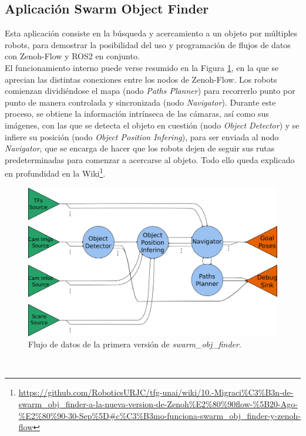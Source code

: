 \subsection{Aplicación Swarm Object Finder}
\label{sec:swarm_obj_finder}

Esta aplicación consiste en la búsqueda y acercamiento a un objeto por múltiples
robots, para demostrar la posibilidad del uso y programación de flujos de datos
con Zenoh-Flow y ROS2 en conjunto.
\\

El funcionamiento interno puede verse resumido en la Figura
\ref{fig:data_flow_scheme}, en la que se aprecian las distintas conexiones entre
los nodos de Zenoh-Flow.
Los robots comienzan dividiéndose el mapa (nodo \textit{Paths Planner}) para
recorrerlo punto por punto de manera controlada y sincronizada (nodo
\textit{Navigator}).
Durante este proceso, se obtiene la información intrínseca de las cámaras, así
como sus imágenes, con las que se detecta el objeto en cuestión (nodo
\textit{Object Detector}) y se infiere su posición (nodo \textit{Object Position
Infering}), para ser enviada al nodo \textit{Navigator}, que se encarga de hacer
que los robots dejen de seguir sus rutas predeterminadas para comenzar a
acercarse al objeto.
Todo ello queda explicado en profundidad en la Wiki\footnote{
\url{https://github.com/RoboticsURJC/tfg-unai/wiki/10.-Migraci\%C3\%B3n-de-swarm\_obj\_finder-a-la-nueva-version-de-Zenoh\%E2\%80\%90flow-\%5B20-Ago-\%E2\%80\%90-30-Sep\%5D\#c\%C3\%B3mo-funciona-swarm\_obj\_finder-y-zenoh-flow}}.

\begin{figure} [h!]
  \begin{center}
    \includegraphics[width=12cm]{figs/data_flow_scheme}
  \end{center}
  \caption{Flujo de datos de la primera versión de \textit{swarm\_obj\_finder}.}
  \label{fig:data_flow_scheme}
\end{figure}\


